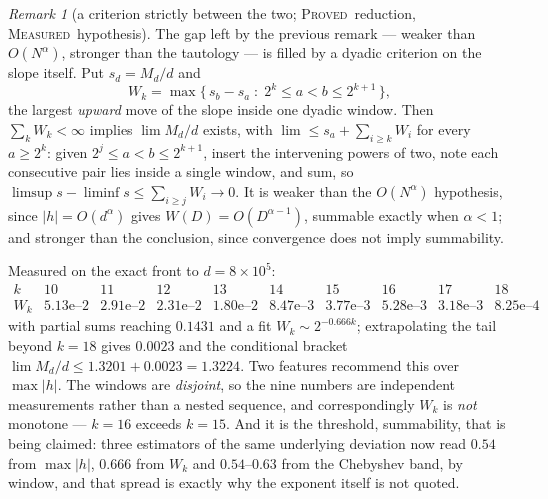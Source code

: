 \documentclass[11pt]{article}
\theoremstyle{definition}
\theoremstyle{remark}
\newtheorem{remark}[theorem]{Remark}
\newcommand{\PROVED}{\textsc{Proved}}
\newcommand{\MEASURED}{\textsc{Measured}}
\begin{document}
\begin{remark}[a criterion strictly between the two; \PROVED\ reduction, \MEASURED\ hypothesis]\label{fr:dyadic}
The gap left by the previous remark --- weaker than $O(N^{\alpha})$, stronger than the tautology --- is
filled by a dyadic criterion on the slope itself. Put $s_d=M_d/d$ and
\[
W_k=\max\{\,s_b-s_a\;:\;2^{k}\le a<b\le2^{k+1}\,\},
\]
the largest \emph{upward} move of the slope inside one dyadic window. Then
$\sum_kW_k<\infty$ implies $\lim M_d/d$ exists, with $\lim\le s_a+\sum_{i\ge k}W_i$ for every
$a\ge2^{k}$: given $2^{j}\le a<b\le2^{k+1}$, insert the intervening powers of two, note each consecutive
pair lies inside a single window, and sum, so $\limsup s-\liminf s\le\sum_{i\ge j}W_i\to0$. It is weaker
than the $O(N^{\alpha})$ hypothesis, since $|h|=O(d^{\alpha})$ gives $W(D)=O(D^{\alpha-1})$, summable
exactly when $\alpha<1$; and stronger than the conclusion, since convergence does not imply
summability.

Measured on the exact front to $d=8\times10^{5}$:
\[
\begin{array}{lccccccccc}
k & 10 & 11 & 12 & 13 & 14 & 15 & 16 & 17 & 18\\
W_k & 5.13\text{e--}2 & 2.91\text{e--}2 & 2.31\text{e--}2 & 1.80\text{e--}2 & 8.47\text{e--}3 &
3.77\text{e--}3 & 5.28\text{e--}3 & 3.18\text{e--}3 & 8.25\text{e--}4
\end{array}
\]
with partial sums reaching $0.1431$ and a fit $W_k\sim2^{-0.666k}$; extrapolating the tail beyond
$k=18$ gives $0.0023$ and the conditional bracket $\lim M_d/d\le1.3201+0.0023=1.3224$. Two features
recommend this over $\max|h|$. The windows are \emph{disjoint}, so the nine numbers are independent
measurements rather than a nested sequence, and correspondingly $W_k$ is \emph{not} monotone --- $k=16$
exceeds $k=15$. And it is the threshold, summability, that is being claimed: three estimators of the
same underlying deviation now read $0.54$ from $\max|h|$, $0.666$ from $W_k$ and $0.54$--$0.63$ from the
Chebyshev band, by window, and that spread is exactly why the exponent itself is not quoted.
\end{remark}
\end{document}
